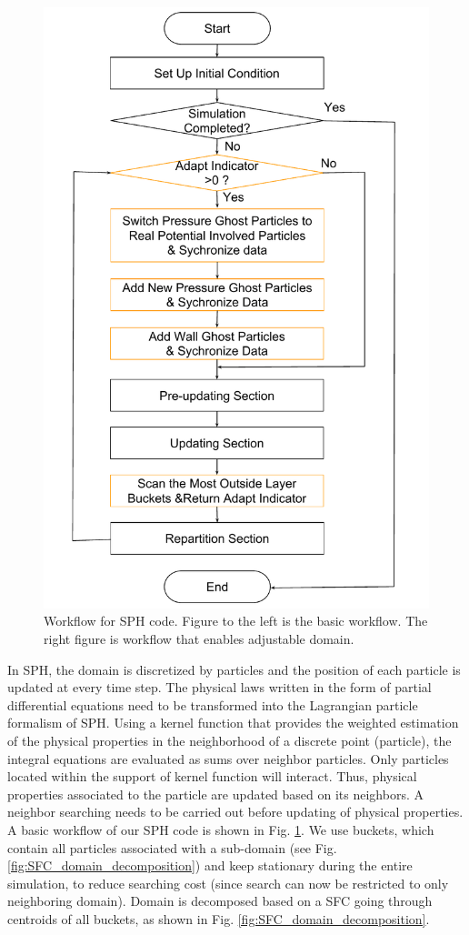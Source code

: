\documentclass[procedia]{easychair}
\begin{document}
\begin{figure}[!t]
\includegraphics[scale=0.28]{Work_flow_adjust}
\caption{Workflow for SPH code. Figure to the left is the basic workflow. The right figure is workflow that enables adjustable domain.}
\label{fig:Work_flow}
\end{figure}
In SPH, the domain is discretized by particles and the position of each particle is updated at every time step. The physical laws written in the form of partial differential equations need to be transformed into the Lagrangian particle formalism of SPH. Using a kernel function that provides the weighted estimation of the physical properties in the neighborhood of a discrete point (particle), the integral equations are evaluated as sums over neighbor particles. Only particles located within the support of kernel function will interact. Thus, physical properties associated to the particle are updated based on its neighbors. A neighbor searching needs to be carried out before updating of physical properties. A basic workflow of our SPH code is shown in Fig. \ref{fig:Work_flow}. We use buckets, which contain all particles associated with a sub-domain (see Fig. \ref{fig:SFC_domain_decomposition}) 
and keep stationary during the entire simulation, to reduce searching cost (since search can now be restricted to only neighboring domain).
Domain is decomposed based on a SFC going through centroids of all buckets, as shown in Fig. \ref{fig:SFC_domain_decomposition}.
\end{document}
